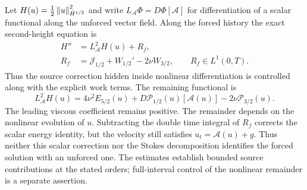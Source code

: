 Let $H(u)=\frac12\left\lVert u\right\rVert_{\dot H^{1/2}}^2$ and write
$L_{\mathcal A}\Phi=D\Phi[\mathcal A]$ for differentiation of a scalar functional along the unforced vector field. Along the forced history the exact second-height equation is
\begin{equation}\label{r:joined-eq:generatorcomparison}
\begin{aligned}
H''&=L_{\mathcal A}^2H(u)+R_f,\\
R_f&=\mathcal J_{1/2}+W_{1/2}'-2\nu W_{3/2},
\qquad R_f\in L^1(0,T).
\end{aligned}
\end{equation}
Thus the source correction hidden inside nonlinear differentiation is controlled along with the explicit work terms. The remaining functional is
\begin{equation}\label{r:joined-eq:autonomousgenerator}
L_{\mathcal A}^2H(u)
=4\nu^2E_{5/2}(u)
+D\mathcal P_{1/2}(u)[\mathcal A(u)]
-2\nu\mathcal P_{3/2}(u).
\end{equation}
The leading viscous coefficient remains positive.
The remainder depends on the nonlinear evolution of \(u\).
Subtracting the double time integral of \(R_f\) corrects the scalar
energy identity, but the velocity still satisfies
\(u_t=\mathcal A(u)+g\). Thus neither this scalar correction nor the
Stokes decomposition identifies the forced solution with an unforced
one. The estimates establish bounded source contributions at the
stated orders; full-interval control of the nonlinear remainder is
a separate assertion.
